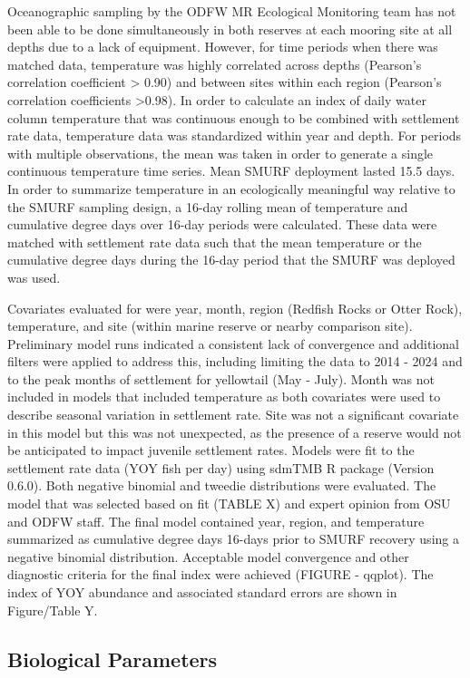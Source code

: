 \documentclass[
]{scrartcl}
\begin{document}
Oceanographic sampling by the ODFW MR Ecological Monitoring team has not
been able to be done simultaneously in both reserves at each mooring
site at all depths due to a lack of equipment. However, for time periods
when there was matched data, temperature was highly correlated across
depths (Pearson's correlation coefficient \textgreater{} 0.90) and
between sites within each region (Pearson's correlation coefficients
\textgreater0.98). In order to calculate an index of daily water column
temperature that was continuous enough to be combined with settlement
rate data, temperature data was standardized within year and depth. For
periods with multiple observations, the mean was taken in order to
generate a single continuous temperature time series. Mean SMURF
deployment lasted 15.5 days. In order to summarize temperature in an
ecologically meaningful way relative to the SMURF sampling design, a
16-day rolling mean of temperature and cumulative degree days over
16-day periods were calculated. These data were matched with settlement
rate data such that the mean temperature or the cumulative degree days
during the 16-day period that the SMURF was deployed was used.

Covariates evaluated for were year, month, region (Redfish Rocks or
Otter Rock), temperature, and site (within marine reserve or nearby
comparison site). Preliminary model runs indicated a consistent lack of
convergence and additional filters were applied to address this,
including limiting the data to 2014 - 2024 and to the peak months of
settlement for yellowtail (May - July). Month was not included in models
that included temperature as both covariates were used to describe
seasonal variation in settlement rate. Site was not a significant
covariate in this model but this was not unexpected, as the presence of
a reserve would not be anticipated to impact juvenile settlement rates.
Models were fit to the settlement rate data (YOY fish per day) using
sdmTMB R package (Version 0.6.0). Both negative binomial and tweedie
distributions were evaluated. The model that was selected based on fit
(TABLE X) and expert opinion from OSU and ODFW staff. The final model
contained year, region, and temperature summarized as cumulative degree
days 16-days prior to SMURF recovery using a negative binomial
distribution. Acceptable model convergence and other diagnostic criteria
for the final index were achieved (FIGURE - qqplot). The index of YOY
abundance and associated standard errors are shown in Figure/Table Y.

\subsection{Biological Parameters}\label{biological-parameters}
\end{document}
